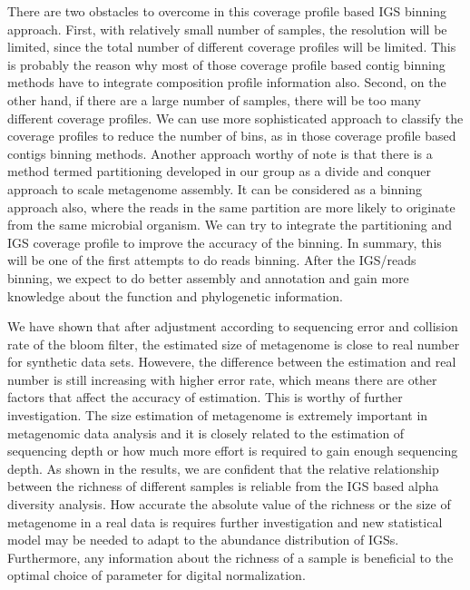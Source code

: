 \documentclass{article}
\begin{document}
There are two obstacles to overcome in this coverage profile based
IGS binning approach. First, with relatively small number of samples, the
resolution will be limited, since the total number of different coverage
profiles will be limited. This is probably the reason why most of those coverage
profile based contig binning methods have to integrate composition profile information
also. Second, on the other hand, if there are a large number of samples, there
will be too many different coverage profiles. We can use more sophisticated
 approach to classify the coverage profiles to reduce the number of bins,
as in those coverage profile based contigs binning methods. Another approach
worthy of note is that there is a method termed partitioning developed in
our group as a divide and conquer approach to scale metagenome assembly. It can be 
considered as a binning approach also, where the reads in the same
partition are more likely to originate from the same microbial organism. We can
try to integrate the partitioning and IGS coverage profile to improve the
accuracy of the binning. In summary, this will be one of the first attempts to
do reads binning. After the IGS/reads binning,  we expect to do better assembly
 and annotation and gain more knowledge about the
function and phylogenetic information.  

We have shown that after adjustment according to sequencing error and collision
rate of the bloom filter, the estimated size of metagenome is close to real
number for synthetic data sets. Howevere, the difference between the estimation and
real number is still increasing with higher error rate, which means there are
other factors that affect the accuracy of estimation. This is worthy of further
investigation. The size estimation of metagenome is extremely important in
metagenomic data analysis and it is closely related to the estimation of
sequencing depth or how much more effort is required to gain enough sequencing
depth. As shown in the results, we are confident that the relative relationship 
between the richness of different samples is reliable from the IGS based alpha
diversity analysis. How accurate the absolute value of the richness or the size
of metagenome in a real data is requires further investigation and new  
statistical model may be needed to adapt to the abundance distribution of IGSs.    
Furthermore, any information about the richness of a sample is beneficial to
the optimal choice of parameter for digital normalization.
\end{document}

